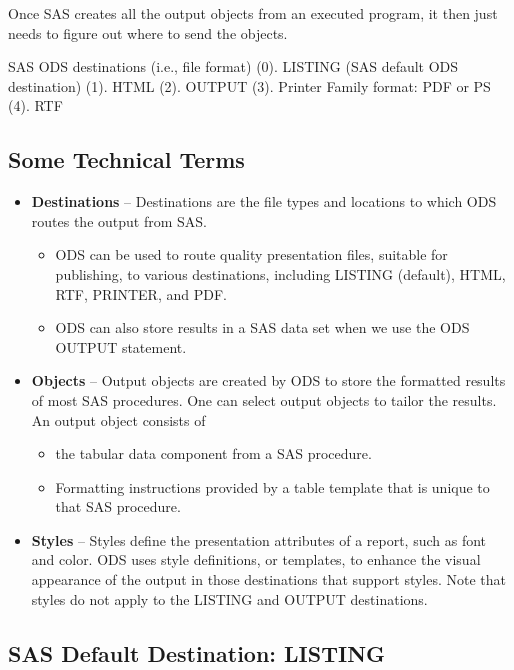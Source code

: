 \documentclass[
]{book}
\providecommand{\tightlist}{%
  \setlength{\itemsep}{0pt}\setlength{\parskip}{0pt}}
\begin{document}
Once SAS creates all the output objects from an executed program, it then just needs to figure out where to send the objects.

SAS ODS destinations (i.e., file format)
(0). LISTING (SAS default ODS destination)
(1). HTML
(2). OUTPUT
(3). Printer Family format: PDF or PS
(4). RTF

\hypertarget{some-technical-terms}{%
\subsection{Some Technical Terms}\label{some-technical-terms}}

\begin{itemize}
\tightlist
\item
  \textbf{Destinations} -- Destinations are the file types and locations to which ODS routes the output from SAS.

  \begin{itemize}
  \tightlist
  \item
    ODS can be used to route quality presentation files, suitable for publishing, to various destinations, including LISTING (default), HTML, RTF, PRINTER, and PDF.
  \item
    ODS can also store results in a SAS data set when we use the ODS OUTPUT statement.
  \end{itemize}
\item
  \textbf{Objects} -- Output objects are created by ODS to store the formatted results of most SAS procedures. One can select output objects to tailor the results. An output object consists of

  \begin{itemize}
  \tightlist
  \item
    the tabular data component from a SAS procedure.
  \item
    Formatting instructions provided by a table template that is unique to that SAS procedure.
  \end{itemize}
\item
  \textbf{Styles} -- Styles define the presentation attributes of a report, such as font and color. ODS uses style definitions, or templates, to enhance the visual appearance of the output in those destinations that support styles. Note that styles do not apply to the LISTING and OUTPUT destinations.
\end{itemize}

\hypertarget{sas-default-destination-listing}{%
\subsection{SAS Default Destination: LISTING}\label{sas-default-destination-listing}}
\end{document}
